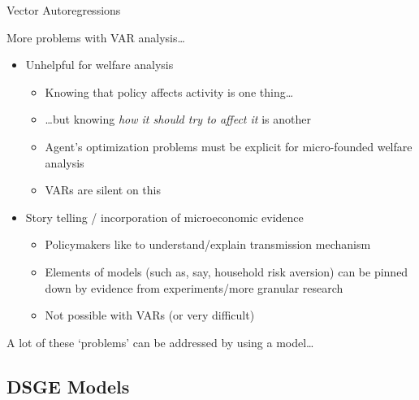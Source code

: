 \begin{frame}{Vector Autoregressions}

More problems with VAR analysis\ldots
\vspace{2mm}
\begin{itemize}
\item	Unhelpful for welfare analysis
	\begin{itemize}
	\item	Knowing that policy affects activity is one thing\ldots
	\item 	\ldots but knowing \emph{how it should try to affect it} is another
	\item 	Agent's optimization problems must be explicit for micro-founded welfare analysis
	\item 	VARs are silent on this
	\end{itemize}
\item	Story telling / incorporation of microeconomic evidence
	\begin{itemize}
	\item 	Policymakers like to understand/explain transmission mechanism
	\item	Elements of models (such as, say, household risk aversion) can be pinned down by evidence from experiments/more granular research
	\item	Not possible with VARs (or very difficult)
	\end{itemize}
\end{itemize}

\vspace{2mm}
A lot of these `problems' can be addressed by using a model\ldots

\end{frame}

\subsection{DSGE Models}

